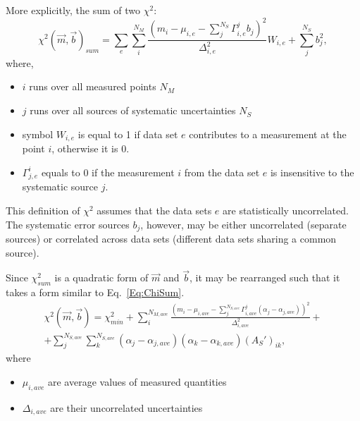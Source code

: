 More explicitly, the sum of two $\chi^2$:
\begin{equation}
  \chi^2(\vec{m},\vec{b})_{sum} = \sum_e \sum_{i}^{N_M} \frac{ \left(m_i-\mu_{i,e}-\sum_j^{N_S} \Gamma_{i,e}^j b_j \right)^2}{\Delta_{i,e}^2} W_{i,e} + \sum_{j}^{N_S} b_j^2,
  \label{Eq:Chi2SumExp2}
\end{equation}
where,
\begin{itemize}
\item $i$ runs over all measured points $N_M$
\item $j$ runs over all sources of systematic uncertainties $N_S$
\item symbol $W_{i,e}$ is equal to 1 if data set $e$ contributes to a measurement at the point $i$, otherwise it is 0.
\item $\Gamma^i_{j,e}$ equals to 0 if the measurement $i$ from the data set $e$ is insensitive to the systematic source $j$.
\end{itemize}
This definition of $\chi^2$ assumes that the data sets $e$ are statistically uncorrelated. The systematic error sources $b_j$, however, may be either uncorrelated (separate sources) or correlated across data sets (different data sets sharing a common source).

Since $\chi^2_{sum}$ is a quadratic form of $\vec{m}$ and $\vec{b}$, it may be rearranged such that it takes a form similar to Eq.~\ref{Eq:ChiSum}.
\begin{eqnarray}
  \chi^2(\vec{m},\vec{b}) = \chi^2_{min}  + \sum_{i}^{N_{M,ave}} \frac{ \left(m_i-\mu_{i,ave}-\sum_j^{N_{S,ave}} \Gamma_{i,ave}^j (\alpha_j-\alpha_{j,ave}) \right)^2}{\Delta_{i,ave}^2} + \nonumber \\
+ \sum_{j}^{N_{S,ave}} \sum_{k}^{N_{S,ave}} (\alpha_j-\alpha_{j,ave})(\alpha_k-\alpha_{k,ave})(A_S')_{ik},
  \label{Eq:ChiBefore}
\end{eqnarray}
where
\begin{itemize}
\item $\mu_{i,ave}$ are average values of measured quantities
\item $\Delta_{i,ave}$ are their uncorrelated uncertainties
\end{itemize}

